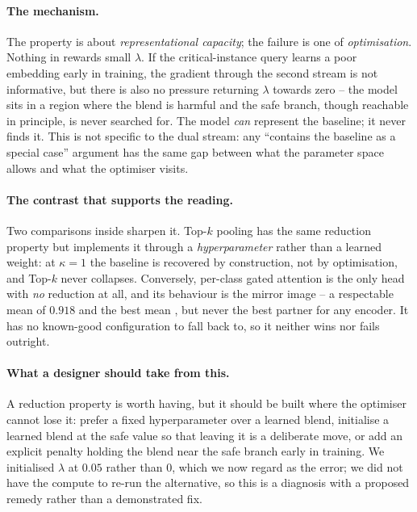 \paragraph{The mechanism.}
The property is about \emph{representational capacity}; the failure is one of \emph{optimisation}.
Nothing in  rewards small $\lambda$. If the critical-instance query learns a poor
embedding early in training, the gradient through the second stream is not informative, but there is
also no pressure returning $\lambda$ towards zero -- the model sits in a region where the blend is
harmful and the safe branch, though reachable in principle, is never searched for. The model
\emph{can} represent the baseline; it never finds it. This is not specific to the dual stream: any
``contains the baseline as a special case'' argument has the same gap between what the parameter
space allows and what the optimiser visits.

\paragraph{The contrast that supports the reading.}
Two comparisons inside  sharpen it. Top-$k$ pooling has the same reduction
property but implements it through a \emph{hyperparameter} rather than a learned weight: at
$\kappa = 1$ the baseline is recovered by construction, not by optimisation, and Top-$k$ never
collapses. Conversely, per-class gated attention is the only head with \emph{no} reduction at all,
and its behaviour is the mirror image -- a respectable mean of $0.918$ and the best mean \ndcg{}, but
never the best partner for any encoder. It has no known-good configuration to fall back to, so it
neither wins nor fails outright.

\paragraph{What a designer should take from this.}
A reduction property is worth having, but it should be built where the optimiser cannot lose it:
prefer a fixed hyperparameter over a learned blend, initialise a learned blend at the safe value so
that leaving it is a deliberate move, or add an explicit penalty holding the blend near the safe
branch early in training. We initialised $\lambda$ at $0.05$ rather than $0$, which we now regard as
the error; we did not have the compute to re-run the alternative, so this is a diagnosis with a
proposed remedy rather than a demonstrated fix.
